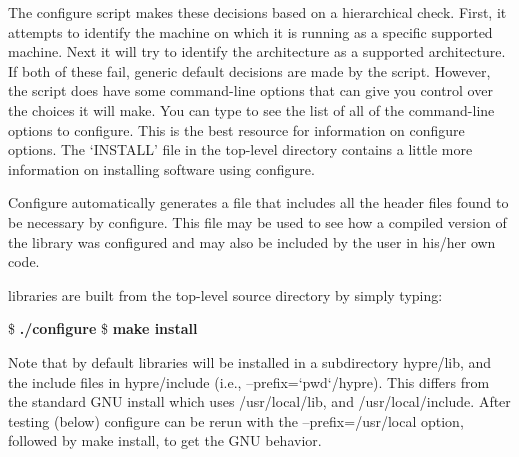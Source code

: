 The configure script makes these decisions based on a hierarchical
check.  First, it attempts to identify the machine on which it is
running as a specific supported machine.  Next it will try to identify
the architecture as a supported architecture.  If both of these fail,
generic default decisions are made by the script.  However, the script
does have some command-line options that can give you control over the
choices it will make.  You can type  to see the
list of all of the command-line options to configure. This is the best
resource for information on configure options.  The `INSTALL' file
in the top-level directory contains a little more information on
installing software using configure. 

Configure automatically generates a file  that
includes all the header files found to be necessary by configure.
This file may be used to see how a compiled version of the library was
configured and may also be included by the user in his/her own code.

\hypre{} libraries are built from the top-level source directory 
by simply typing:
\begin{ttfamily}
\begin{mdseries}
\linebreak
\$ \textbf{./configure}\linebreak
\$ \textbf{make install}\linebreak
\linebreak
\end{mdseries}
\end{ttfamily}
Note that by default \hypre{} libraries will be
installed in a subdirectory hypre/lib, and the include files in
hypre/include (i.e., --prefix=`pwd`/hypre). This differs from the standard
GNU install which uses /usr/local/lib, and /usr/local/include. After
testing (below) configure can be rerun with the --prefix=/usr/local
option, followed by make install, to get the GNU behavior.

